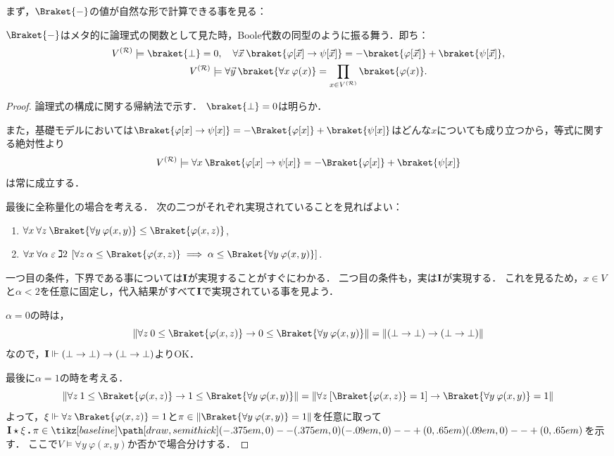 \documentclass[realisability.tex]{subfiles}
\begin{document}
まず，$\Braket{ - }$の値が自然な形で計算できる事を見る：
\begin{lemma}\label{lem:char-homo}
 $\Braket{ - }$はメタ的に論理式の関数として見た時，Boole代数の同型のように振る舞う．即ち：
 \begin{gather*}
  V^{(\mathcal{R})} \models \braket{\bot} = 0, \quad \forall \vec{x}\: \braket{\varphi[\vec{x}] \to \psi[\vec{x}]} = - \braket{\varphi[\vec{x}]} + \braket{\psi[\vec{x}]},\\
  V^{(\mathcal{R})} \models \forall \vec{y} \: \braket{\forall x \: \varphi(x)} = \prod_{x \in V^{(\mathcal{R})}} \braket{\varphi(x)}.
 \end{gather*}
\end{lemma}
\begin{proof}
 論理式の構成に関する帰納法で示す．
 $\braket{\bot} = 0$は明らか．

 また，基礎モデルにおいては$\Braket{ \varphi[x] \to \psi[x] } = -\Braket{\varphi[x]} + \braket{\psi[x]}$はどんな$x$についても成り立つから，等式に関する絶対性より
 \[
  V^{(\mathcal{R})} \models \forall x \: \Braket{ \varphi[x] \to \psi[x] } = -\Braket{\varphi[x]} + \braket{\psi[x]}
 \]
 は常に成立する．

 最後に全称量化の場合を考える．
 次の二つがそれぞれ実現されていることを見ればよい：
 \begin{enumerate}
  \item $\forall x \: \forall z \: \Braket{\forall y \: \varphi(x, y) } \leq \Braket{\varphi(x, z)}$,
  \item $\forall x \: \forall \alpha \strin \gimel 2\:
          \left[\forall z \: \alpha \leq \Braket{\varphi(x, z)}
            \implies \alpha \leq \Braket{\forall y \: \varphi(x,y)}
          \right]$.
 \end{enumerate}
 一つ目の条件，下界である事については$\mathsf{\mathbf{I}}$が実現することがすぐにわかる．
 二つ目の条件も，実は$\mathsf{\mathbf{I}}$が実現する．
 これを見るため，$x \in V$と$\alpha < 2$を任意に固定し，代入結果がすべて$\mathsf{\mathbf{I}}$で実現されている事を見よう．

 $\alpha = 0$の時は，
 \[
  \|\forall z \: 0 \leq \Braket{\varphi(x, z)}
 \to 0 \leq \Braket{\forall y \: \varphi(x,y)}\| = \|(\bot \to \bot) \to (\bot \to \bot)\|
 \]
 なので，$\mathsf{\mathbf{I}} \Vdash (\bot \to \bot) \to (\bot \to \bot)$よりOK．

 最後に$\alpha = 1$の時を考える．
 \[
  \|\forall z \: 1 \leq \Braket{\varphi(x, z)}
 \to 1 \leq \Braket{\forall y \: \varphi(x,y)}\| =
 \|\forall z \:[\Braket{\varphi(x, z)} = 1]
 \to \Braket{\forall y \: \varphi(x,y)} = 1\|
 \]
 よって，$\xi \Vdash \forall z \: \Braket{\varphi(x,z)} = 1$と$\pi \in \|\Braket{\forall y \: \varphi(x,y)} = 1\|$を任意に取って$\comb{I} \cons \xi \push \pi \in \pole$を示す．
 ここで$V \models \forall y \: \varphi(x,y)$か否かで場合分けする．


\end{proof}
\end{document}

